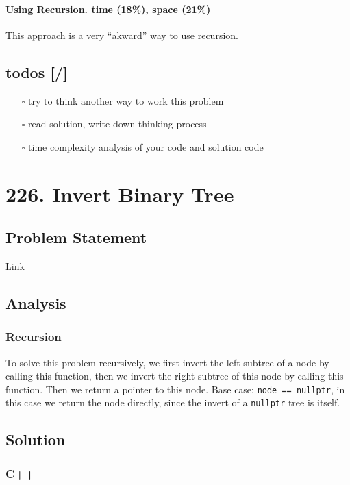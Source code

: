 \documentclass[11pt]{article}
\begin{document}
\paragraph{Using Recursion. time (18\%), space (21\%)}
\label{sec:org6c9d50f}
This approach is a very ``akward'' way to use recursion.
\subsection{todos [/]}
\label{sec:org38ea608}
\begin{itemize}
\item[{$\square$}] try to think another way to work this problem
\item[{$\square$}] read solution, write down thinking process
\item[{$\square$}] time complexity analysis of your code and solution code
\end{itemize}
\section{226. Invert Binary Tree}
\label{sec:org5901c4a}
\subsection{Problem Statement}
\label{sec:org72889e3}
\href{https://leetcode.com/problems/invert-binary-tree/}{Link}
\subsection{Analysis}
\label{sec:org90ad543}
\subsubsection{Recursion}
\label{sec:org6806b1c}
To solve this problem recursively, we first invert the left subtree of a node by calling this function, then we invert the right subtree of this node by calling this function. Then we return a pointer to this node. Base case: \texttt{node == nullptr}, in this case we return the node directly, since the invert of a \texttt{nullptr} tree is itself.
\subsection{Solution}
\label{sec:org05ec40f}
\subsubsection{C++}
\label{sec:org9aeb44b}
\end{document}
